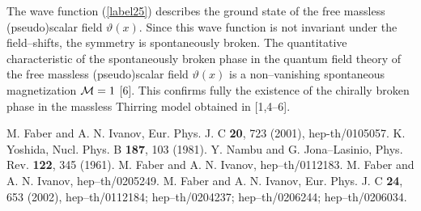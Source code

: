 \documentclass[a4paper,12pt] {article}
\begin{document}
The wave function (\ref{label25}) describes the ground state of the
free massless (pseudo)scalar field $\vartheta(x)$. Since this wave
function is not invariant under the field--shifts, the symmetry is
spontaneously broken. The quantitative characteristic of the
spontaneously broken phase in the quantum field theory of the free
massless (pseudo)scalar field $\vartheta(x)$ is a non--vanishing
spontaneous magnetization ${\cal M} = 1$ [6]. This confirms fully the
existence of the chirally broken phase in the massless Thirring model
obtained in [1,4--6].


\begin{thebibliography}{9}
\bibitem{[1]} 
M. Faber and A. N. Ivanov, 
Eur. Phys. J. C {\bf 20}, 723
(2001), hep-th/0105057.
\bibitem{[2]}
K. Yoshida,
Nucl. Phys. B {\bf 187}, 103 (1981).
\bibitem{[3]}
Y. Nambu and G. Jona--Lasinio,
Phys. Rev. {\bf 122}, 345 (1961).
\bibitem{[4]}
M. Faber and A. N. Ivanov, hep--th/0112183.
\bibitem{[5]}
M. Faber and A. N. Ivanov, hep--th/0205249.
\bibitem{[6]} 
M. Faber and A. N. Ivanov, Eur. Phys. J. C {\bf 24}, 653 (2002), 
hep--th/0112184; hep--th/0204237; hep--th/0206244; hep--th/0206034.
\end{thebibliography}
\end{document}
